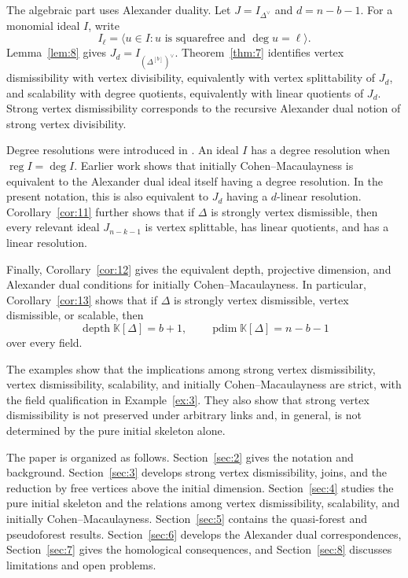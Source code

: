 \documentclass[11pt]{amsart}
\newcommand{\K}{\mathbb K}
\DeclareMathOperator{\depth}{depth}
\DeclareMathOperator{\pdim}{pdim}
\DeclareMathOperator{\reg}{reg}
\theoremstyle{definition}
\begin{document}
	The algebraic part uses Alexander duality. Let $J=I_{\Delta^\vee}$ and $d=n-b-1$. For a monomial ideal $I$, write
	\[
	I_\ell=
	\bigl\langle
	u\in I:
	u\text{ is squarefree and }\deg u=\ell
	\bigr\rangle.
	\]
	Lemma~\ref{lem:8} gives $J_d=I_{(\Delta^{[b]})^\vee}$. Theorem~\ref{thm:7} identifies vertex dismissibility with vertex divisibility, equivalently with vertex splittability of $J_d$, and scalability with degree quotients, equivalently with linear quotients of $J_d$. Strong vertex dismissibility corresponds to the recursive Alexander dual notion of strong vertex divisibility.
	
	Degree resolutions were introduced in \cite{Namiq2026Skeletons}. An ideal $I$ has a degree resolution when $\reg I=\deg I$. Earlier work \cite{Namiq2026ICM} shows that initially Cohen--Macaulayness is equivalent to the Alexander dual ideal itself having a degree resolution. In the present notation, this is also equivalent to $J_d$ having a $d$-linear resolution. Corollary~\ref{cor:11} further shows that if $\Delta$ is strongly vertex dismissible, then every relevant ideal $J_{n-k-1}$ is vertex splittable, has linear quotients, and has a linear resolution.
	
	Finally, Corollary~\ref{cor:12} gives the equivalent depth, projective dimension, and Alexander dual conditions for initially Cohen--Macaulayness. In particular, Corollary~\ref{cor:13} shows that if $\Delta$ is strongly vertex dismissible, vertex dismissible, or scalable, then
	\[
	\depth\K[\Delta]=b+1,
	\qquad
	\pdim\K[\Delta]=n-b-1
	\]
	over every field.
	
	The examples show that the implications among strong vertex dismissibility, vertex dismissibility, scalability, and initially Cohen--Macaulayness are strict, with the field qualification in Example~\ref{ex:3}. They also show that strong vertex dismissibility is not preserved under arbitrary links and, in general, is not determined by the pure initial skeleton alone.
	
	The paper is organized as follows. Section~\ref{sec:2} gives the notation and background. Section~\ref{sec:3} develops strong vertex dismissibility, joins, and the reduction by free vertices above the initial dimension. Section~\ref{sec:4} studies the pure initial skeleton and the relations among vertex dismissibility, scalability, and initially Cohen--Macaulayness. Section~\ref{sec:5} contains the quasi-forest and pseudoforest results. Section~\ref{sec:6} develops the Alexander dual correspondences, Section~\ref{sec:7} gives the homological consequences, and Section~\ref{sec:8} discusses limitations and open problems.
	
\end{document}
